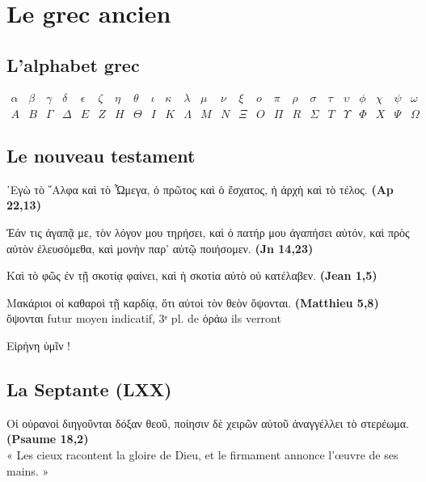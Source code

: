 \chapter{Le grec ancien}
\section{L'alphabet grec}
\[
\begin{array}{cccccccccccccccccccccccc}
 \alpha & \beta &\gamma &  \delta & \epsilon & \zeta & \eta &\theta & \iota &\kappa &\lambda & \mu & \nu & \xi & o & \pi & \rho & \sigma & \tau & 
 \upsilon & \phi & \chi & \psi & \omega \\
 A & B & \Gamma & \Delta & E & Z & H & \Theta & I & K & \Lambda & M & N  &\Xi & O & \Pi & R & \Sigma & T & \Upsilon & \Phi & X & \Psi & \Omega
 \end{array}
 \]

\section{Le nouveau testament}
 \vspace*{1cm}
 \begin{center}
\end{center}

\vspace{0.5cm}

᾿Εγὼ τὸ ῎Αλφα καὶ τὸ Ὦμεγα, ὁ πρῶτος καὶ ὁ ἔσχατος, ἡ ἀρχὴ καὶ τὸ τέλος. \textbf{(Ap 22,13)}

 Ἐάν τις ἀγαπᾷ με, τὸν λόγον μου τηρήσει, καὶ ὁ πατήρ μου ἀγαπήσει αὐτόν,
 καὶ πρὸς αὐτὸν ἐλευσόμεθα, καὶ μονὴν παρ’ αὐτῷ ποιήσομεν. \textbf{(Jn 14,23)}

Kαὶ τὸ φῶς ἐν τῇ σκοτίᾳ φαίνει, καὶ ἡ σκοτία αὐτὸ οὐ κατέλαβεν. \textbf{(Jean 1,5)}

Μακάριοι οἱ καθαροὶ τῇ καρδίᾳ, ὅτι αὐτοὶ τὸν θεὸν ὄψονται.  \textbf{(Matthieu 5,8)} \\
ὄψονται	futur moyen indicatif, 3ᵉ pl. de ὁράω	ils verront

Εἰρήνη ὑμῖν !

\section{La Septante (LXX)}
Οἱ οὐρανοὶ διηγοῦνται δόξαν θεοῦ, ποίησιν δὲ χειρῶν αὐτοῦ ἀναγγέλλει τὸ στερέωμα.
\textbf{(Psaume 18,2)} \\
« Les cieux racontent la gloire de Dieu, et le firmament annonce l’œuvre de ses mains. »
